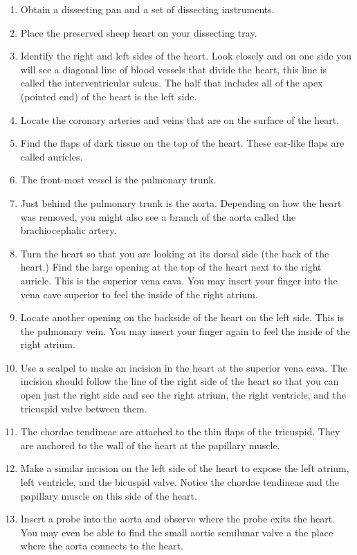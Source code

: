 \documentclass[]{book}
\providecommand{\tightlist}{%
  \setlength{\itemsep}{0pt}\setlength{\parskip}{0pt}}
\theoremstyle{definition}
\theoremstyle{definition}
\theoremstyle{definition}
\theoremstyle{remark}
\begin{document}
\begin{enumerate}
\def\labelenumi{\arabic{enumi}.}
\tightlist
\item
  Obtain a dissecting pan and a set of dissecting instruments.
\item
  Place the preserved sheep heart on your dissecting tray.
\item
  Identify the right and left sides of the heart. Look closely and on
  one side you will see a diagonal line of blood vessels that divide the
  heart, this line is called the interventricular sulcus. The half that
  includes all of the apex (pointed end) of the heart is the left side.
\item
  Locate the coronary arteries and veins that are on the surface of the
  heart.
\item
  Find the flaps of dark tissue on the top of the heart. These ear-like
  flaps are called auricles.
\item
  The front-most vessel is the pulmonary trunk.
\item
  Just behind the pulmonary trunk is the aorta. Depending on how the
  heart was removed, you might also see a branch of the aorta called the
  brachiocephalic artery.
\item
  Turn the heart so that you are looking at its dorsal side (the back of
  the heart.) Find the large opening at the top of the heart next to the
  right auricle. This is the superior vena cava. You may insert your
  finger into the vena cave superior to feel the inside of the right
  atrium.
\item
  Locate another opening on the backside of the heart on the left side.
  This is the pulmonary vein. You may insert your finger again to feel
  the inside of the right atrium.
\item
  Use a scalpel to make an incision in the heart at the superior vena
  cava. The incision should follow the line of the right side of the
  heart so that you can open just the right side and see the right
  atrium, the right ventricle, and the tricuspid valve between them.
\item
  The chordae tendineae are attached to the thin flaps of the tricuspid.
  They are anchored to the wall of the heart at the papillary muscle.
\item
  Make a similar incision on the left side of the heart to expose the
  left atrium, left ventricle, and the bicuspid valve. Notice the
  chordae tendineae and the papillary muscle on this side of the heart.
\item
  Insert a probe into the aorta and observe where the probe exits the
  heart. You may even be able to find the small aortic semilunar valve a
  the place where the aorta connects to the heart.
\end{enumerate}
\end{document}
